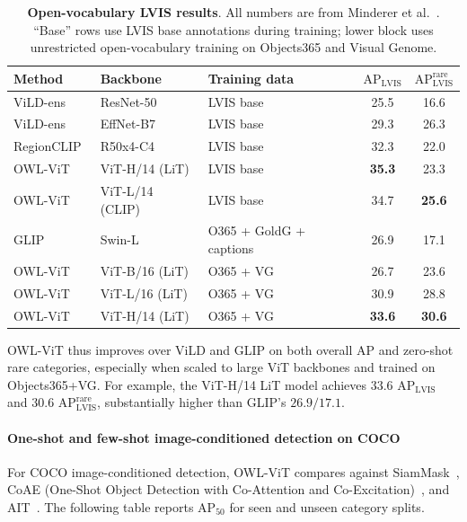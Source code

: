 \begin{enrichment}
\begin{enrichment}
		\begin{table}[H]
			\centering
			\small
			\caption{\textbf{Open-vocabulary LVIS results}. All numbers are from Minderer et al.~\cite{minderer2022_owlvit}. ``Base'' rows use LVIS base annotations during training; lower block uses unrestricted open-vocabulary training on Objects365 and Visual Genome.}
			\label{tab:chapter14_owlvit_lvis}
			\begin{tabular}{l l l c c}
				\toprule
				Method & Backbone & Training data & $\text{AP}_{\text{LVIS}}$ & $\text{AP}_{\text{LVIS}}^{\text{rare}}$ \\
				\midrule
				ViLD-ens~\cite{gu2022_vild} & ResNet-50 & LVIS base & 25.5 & 16.6 \\
				ViLD-ens~\cite{gu2022_vild} & EffNet-B7 & LVIS base & 29.3 & 26.3 \\
				RegionCLIP~\cite{zhong2021_regionclip} & R50x4-C4 & LVIS base & 32.3 & 22.0 \\
				OWL-ViT~\cite{minderer2022_owlvit} & ViT-H/14 (LiT) & LVIS base & \textbf{35.3} & 23.3 \\
				OWL-ViT~\cite{minderer2022_owlvit} & ViT-L/14 (CLIP) & LVIS base & 34.7 & \textbf{25.6} \\
				\midrule
				GLIP~\cite{li2022_glip} & Swin-L & O365 + GoldG + captions & 26.9 & 17.1 \\
				OWL-ViT~\cite{minderer2022_owlvit} & ViT-B/16 (LiT) & O365 + VG & 26.7 & 23.6 \\
				OWL-ViT~\cite{minderer2022_owlvit} & ViT-L/16 (LiT) & O365 + VG & 30.9 & 28.8 \\
				OWL-ViT~\cite{minderer2022_owlvit} & ViT-H/14 (LiT) & O365 + VG & \textbf{33.6} & \textbf{30.6} \\
				\bottomrule
			\end{tabular}
		\end{table}
		
		OWL-ViT thus improves over ViLD and GLIP on both overall AP and zero-shot rare categories, especially when scaled to large ViT backbones and trained on Objects365+VG.
		For example, the ViT-H/14 LiT model achieves \(33.6\) \(\text{AP}_{\text{LVIS}}\) and \(30.6\) \(\text{AP}_{\text{LVIS}}^{\text{rare}}\), substantially higher than GLIP’s \(26.9 / 17.1\).
		
		\paragraph{One-shot and few-shot image-conditioned detection on COCO}
		For COCO image-conditioned detection, OWL-ViT compares against SiamMask~\cite{hu2022_siammask}, CoAE (One-Shot Object Detection with Co-Attention and Co-Excitation)~\cite{hsieh2019_oneshot}, and AIT~\cite{chen2021_ait}.
		The following table reports AP$_{50}$ for seen and unseen category splits.
		

\end{enrichment}
\end{enrichment}

